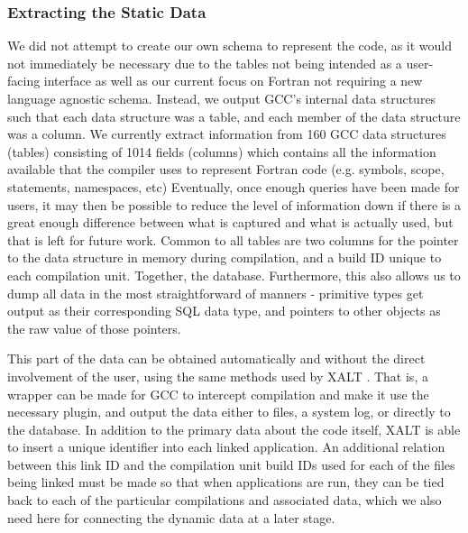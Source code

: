 \subsubsection{Extracting the Static Data}
We did not attempt to create our own schema to represent the code, as it would not immediately be 
necessary due to the tables not being intended as a user-facing interface as well as our current 
focus 
on Fortran not requiring a new language agnostic schema.
Instead, we output \acs{GCC}'s internal data structures such that each data structure 
was a table, and each member of the data structure was a column.
We currently extract information from 160 \acs{GCC} data structures (tables) consisting of 1014 
fields (columns) which contains all the information available that the compiler uses to represent Fortran code (e.g. symbols, scope, statements, namespaces, etc)
Eventually, once enough queries have been made for users, it may then be possible to reduce the 
level of information down if there is a great enough difference between what is captured and what is 
actually used, but that is left for future work.
Common to all tables are two columns for the pointer to the data structure in memory during 
compilation, and a build ID unique to each compilation unit.
Together, 
the database.
Furthermore, this also allows us to dump all data in the most straightforward of manners - primitive 
types get output as their corresponding \acs{SQL} data type, and pointers to other objects as the 
raw value of those pointers.

This part of the data can be obtained automatically and without the direct involvement of the user, 
using the same methods used by XALT \cite{7081224}.
That is, a wrapper can be made for \acs{GCC} to intercept compilation and make it use the 
necessary 
plugin, and output the data either to files, a system log, or directly to the database.
In addition to the primary data about the code itself, XALT is able to insert a unique identifier into 
each 
linked application.
An additional relation between this link ID and the compilation unit build IDs used for each of the files 
being linked must be made so that when applications are run, they can be tied back to each of the 
particular compilations and associated data, which we also need here for connecting the dynamic 
data at a later stage.

